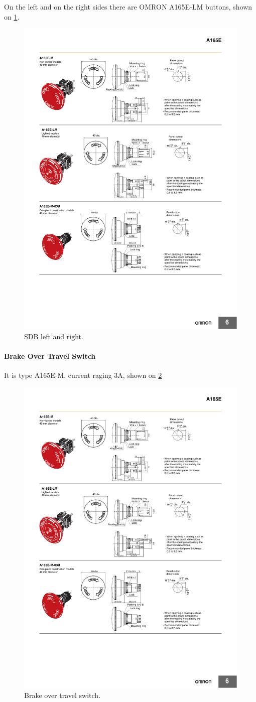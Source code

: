 On the left and on the right sides there are OMRON A165E-LM buttons, shown on \ref{fig:SDC-A165E-LM}.
\begin{figure}[H]
	\centering
	\includegraphics[width=.5\textwidth]{./img/SDC-A165E-LM.pdf}
	\caption{SDB left and right.}
	\label{fig:SDC-A165E-LM}
\end{figure}

\paragraph{Brake Over Travel Switch}
It is type A165E-M, current raging 3A, shown on \ref{fig:SDC-A165E-M}
\begin{figure}[H]
	\centering
	\includegraphics[width=.5\textwidth]{./img/SDC-A165E-M.pdf}
	\caption{Brake over travel switch.}
	\label{fig:SDC-A165E-M}
\end{figure}


